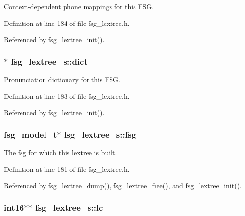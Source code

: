 Context-\/dependent phone mappings for this F\+S\+G. 



Definition at line 184 of file fsg\+\_\+lextree.\+h.



Referenced by fsg\+\_\+lextree\+\_\+init().

\subsubsection[{dict}]{$\ast$ fsg\+\_\+lextree\+\_\+s\+::dict}\label{structfsg__lextree__s_abf077af1c0dd1246b2032b917bfacba5}


Pronunciation dictionary for this F\+S\+G. 



Definition at line 183 of file fsg\+\_\+lextree.\+h.



Referenced by fsg\+\_\+lextree\+\_\+init().

\subsubsection[{fsg}]{\setlength{\rightskip}{0pt plus 5cm}fsg\+\_\+model\+\_\+t$\ast$ fsg\+\_\+lextree\+\_\+s\+::fsg}\label{structfsg__lextree__s_a161ff35c65373388f18e51236bf7ef5f}


The fsg for which this lextree is built. 



Definition at line 181 of file fsg\+\_\+lextree.\+h.



Referenced by fsg\+\_\+lextree\+\_\+dump(), fsg\+\_\+lextree\+\_\+free(), and fsg\+\_\+lextree\+\_\+init().

\subsubsection[{lc}]{\setlength{\rightskip}{0pt plus 5cm}int16$\ast$$\ast$ fsg\+\_\+lextree\+\_\+s\+::lc}\label{structfsg__lextree__s_a0655f40ec98c9d971aba1fa8a894575d}


